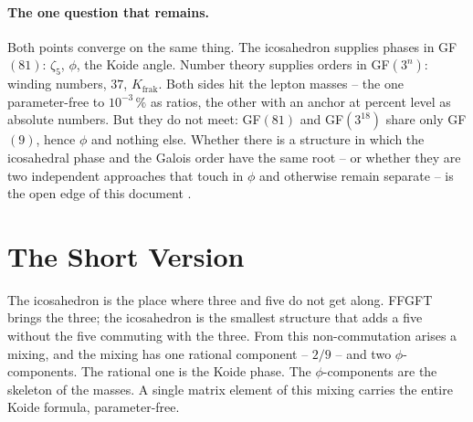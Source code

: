 \paragraph{The one question that remains.}
Both points converge on the same thing. The icosahedron supplies phases in
GF$(81)$: $\zeta_5$, $\phi$, the Koide angle. Number theory supplies orders in
GF$(3^n)$: winding numbers, $37$, $K_\text{frak}$. Both sides hit the lepton
masses -- the one parameter-free to $10^{-3}\,\%$ as ratios, the other with an
anchor at percent level as absolute numbers. But they do not meet: GF$(81)$ and
GF$(3^{18})$ share only GF$(9)$, hence $\phi$ and nothing else. Whether there is
a structure in which the icosahedral phase and the Galois order have the same
root -- or whether they are two independent approaches that touch in $\phi$ and
otherwise remain separate -- is the open edge of this document \SM.

\section{The Short Version}

The icosahedron is the place where three and five do not get along. FFGFT
brings the three; the icosahedron is the smallest structure that adds a five
without the five commuting with the three. From this non-commutation arises a
mixing, and the mixing has one rational component -- $2/9$ -- and two
$\phi$-components. The rational one is the Koide phase. The $\phi$-components
are the skeleton of the masses. A single matrix element of this mixing carries
the entire Koide formula, parameter-free.
